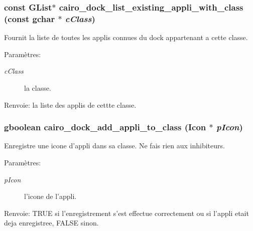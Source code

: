 \subsubsection{\setlength{\rightskip}{0pt plus 5cm}const GList$\ast$ cairo\_\-dock\_\-list\_\-existing\_\-appli\_\-with\_\-class (const gchar $\ast$ {\em cClass})}\label{cairo-dock-class-manager_8h_faf33ade4aa3c5696507e023886b5367}


Fournit la liste de toutes les applis connues du dock appartenant a cette classe. \begin{Desc}
\item[Paramètres:]
\begin{description}
\item[{\em cClass}]la classe. \end{description}
\end{Desc}
\begin{Desc}
\item[Renvoie:]la liste des applis de cettte classe. \end{Desc}
\subsubsection{\setlength{\rightskip}{0pt plus 5cm}gboolean cairo\_\-dock\_\-add\_\-appli\_\-to\_\-class ({\bf Icon} $\ast$ {\em pIcon})}\label{cairo-dock-class-manager_8h_252931b6e9b1806cdb5a02eb7daf8bb5}


Enregistre une icone d'appli dans sa classe. Ne fais rien aux inhibiteurs. \begin{Desc}
\item[Paramètres:]
\begin{description}
\item[{\em pIcon}]l'icone de l'appli. \end{description}
\end{Desc}
\begin{Desc}
\item[Renvoie:]TRUE si l'enregistrement s'est effectue correctement ou si l'appli etait deja enregistree, FALSE sinon. \end{Desc}
